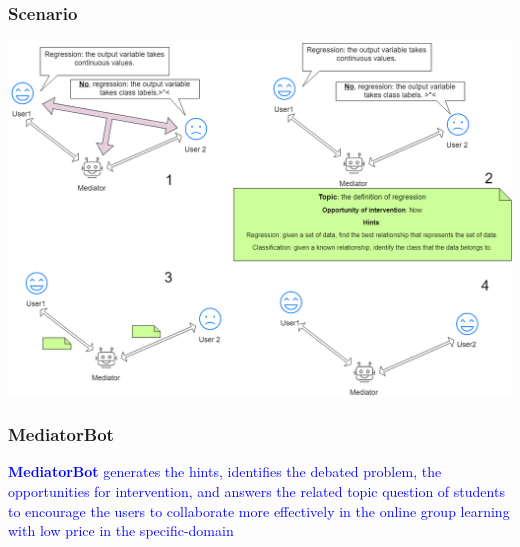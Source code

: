 \documentclass{beamer}
\begin{document}
\begin{frame}


\frametitle{Scenario}



\begin{center}
	\includegraphics[width=.9\columnwidth]{cvf1}
\end{center}


\end{frame}


\begin{frame}
\frametitle{MediatorBot}
\begin{center}
	
\end{center}
\textcolor{blue}{\textbf{MediatorBot} generates the hints, identifies the debated problem, the opportunities for intervention, and answers the related topic question of students to encourage the users to collaborate more effectively in the online group learning with low price in the specific-domain}
\end{frame}








\end{document}
